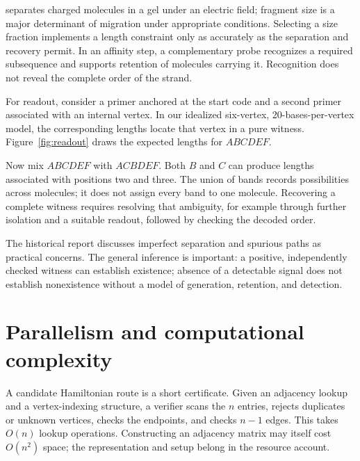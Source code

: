  separates charged molecules in a gel under an electric field; fragment size is a major determinant of migration under appropriate conditions.\cite{gel} Selecting a size fraction implements a length constraint only as accurately as the separation and recovery permit. In an affinity step, a complementary probe recognizes a required subsequence and supports retention of molecules carrying it. Recognition does not reveal the complete order of the strand.

For readout, consider a primer anchored at the start code and a second primer associated with an internal vertex. In our idealized six-vertex, 20-bases-per-vertex model, the corresponding lengths locate that vertex in a pure witness. Figure~\ref{fig:readout} draws the expected lengths for $ABCDEF$.

Now mix $ABCDEF$ with $ACBDEF$. Both $B$ and $C$ can produce lengths associated with positions two and three. The union of bands records possibilities across molecules; it does not assign every band to one molecule. Recovering a complete witness requires resolving that ambiguity, for example through further isolation and a suitable readout, followed by checking the decoded order.

The historical report discusses imperfect separation and spurious paths as practical concerns.\cite{adleman} The general inference is important: a positive, independently checked witness can establish existence; absence of a detectable signal does not establish nonexistence without a model of generation, retention, and detection.

\section{Parallelism and computational complexity}\label{sec:complexity}
A candidate Hamiltonian route is a short certificate. Given an adjacency lookup and a vertex-indexing structure, a verifier scans the $n$ entries, rejects duplicates or unknown vertices, checks the endpoints, and checks $n-1$ edges. This takes $O(n)$ lookup operations. Constructing an adjacency matrix may itself cost $O(n^2)$ space; the representation and setup belong in the resource account.

